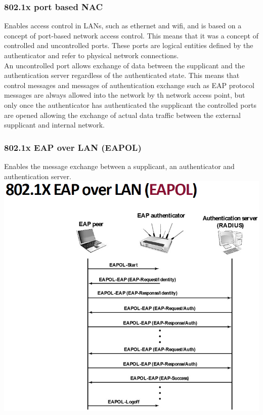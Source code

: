 \documentclass[12pt]{article}
\begin{document}
 \subsubsection{802.1x port based NAC}
 Enables access control in LANs, such as ethernet and wifi, and is based on a concept of port-based network access control. This means that it was a concept of controlled and uncontrolled ports. These ports are logical entities defined by the authenticator and refer to physical network connections.\\
 An uncontrolled port allows exchange of data between the supplicant and the authentication server regardless of the authenticated state. This means that control messages and messages of authentication exchange such as EAP protocol messages are always allowed into the network by th network access point, but only once the authenticator has authenticated the supplicant the controlled ports are opened allowing the exchange of actual data traffic between the external supplicant and internal network.
 
 \subsubsection{802.1x EAP over LAN (EAPOL)}
 Enables the message exchange between a supplicant, an authenticator and authentication server.\\
 \includegraphics[width=\linewidth]{./slides/L6P2EAPOL.PNG}
 
\end{document}
